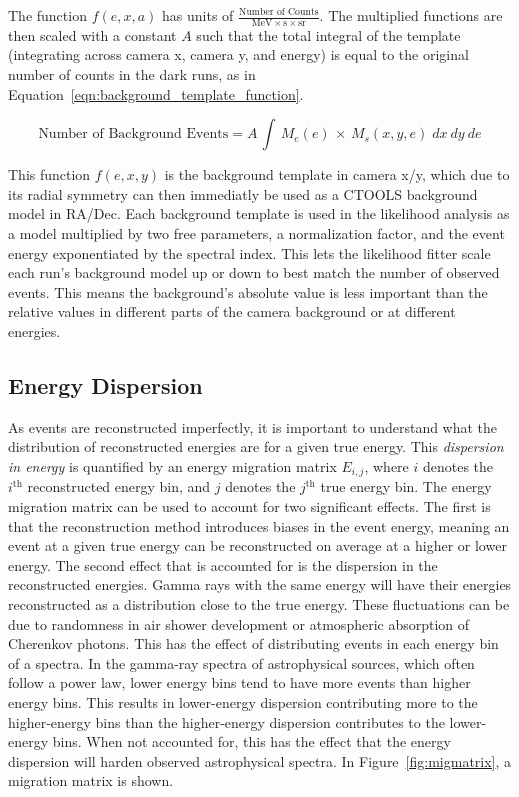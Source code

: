     The function $f(e,x,a)$ has units of $\frac{\textrm{Number of Counts}}{ \textrm{MeV} \times \textrm{s} \times \textrm{sr} }$.
    The multiplied functions are then scaled with a constant $A$ such that the total integral of the template (integrating across camera x, camera y, and energy) is equal to the original number of counts in the dark runs, as in Equation~\ref{eqn:background_template_function}.
    
    \begin{equation}\label{eqn:background_template_function}
      \textrm{Number of Background Events} = A \, \int \, M_{e} \left ( e \right ) \, \times \, M_{s} \left ( x, y, e \right ) \; dx \: dy \: de
    \end{equation}

    This function $f(e,x,y)$ is the background template in camera x/y, which due to its radial symmetry can then immediatly be used as a CTOOLS background model in RA/Dec.
    Each background template is used in the likelihood analysis as a model multiplied by two free parameters, a normalization factor, and the event energy exponentiated by the spectral index.
    This lets the likelihood fitter scale each run's background model up or down to best match the number of observed events.
    This means the background's absolute value is less important than the relative values in different parts of the camera background or at different energies.
  
  \FloatBarrier

  \subsection{Energy Dispersion}\label{subsec:edisp}
    As events are reconstructed imperfectly, it is important to understand what the distribution of reconstructed energies are for a given true energy.
    This \textit{dispersion in energy} is quantified by an energy migration matrix $E_{i,j}$, where $i$ denotes the $i^{\text{th}}$ reconstructed energy bin, and $j$ denotes the $j^{\text{th}}$ true energy bin.
    The energy migration matrix can be used to account for two significant effects.
    The first is that the reconstruction method introduces biases in the event energy, meaning an event at a given true energy can be reconstructed on average at a higher or lower energy.
    The second effect that is accounted for is the dispersion in the reconstructed energies.
    Gamma rays with the same energy will have their energies reconstructed as a distribution close to the true energy.
    These fluctuations can be due to randomness in air shower development or atmospheric absorption of Cherenkov photons.
    This has the effect of distributing events in each energy bin of a spectra.
    In the gamma-ray spectra of astrophysical sources, which often follow a power law, lower energy bins tend to have more events than higher energy bins.
    This results in lower-energy dispersion contributing more to the higher-energy bins than the higher-energy dispersion contributes to the lower-energy bins.
    When not accounted for, this has the effect that the energy dispersion will harden observed astrophysical spectra.
    In Figure~\ref{fig:migmatrix}, a migration matrix is shown.

